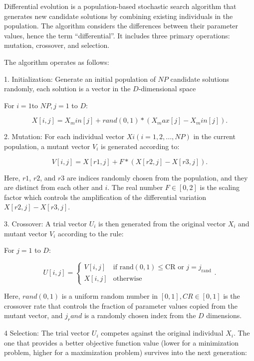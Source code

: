 \documentclass[a4paper,12pt]{article}
\begin{document}
Differential evolution is a population-based stochastic search algorithm that generates new candidate solutions by combining existing individuals in the population. The algorithm considers the differences between their parameter values, hence the term ``differential''. It includes three primary operations: mutation, crossover, and selection.

The algorithm operates as follows:

1. Initialization: Generate an initial population of $NP$ candidate solutions randomly, each solution is a vector in the $D$-dimensional space
    
    For $i = 1 $to $NP, j = 1$ to $D$:
    
    $$X[i, j] = X_min[j] + rand(0, 1) * (X_max[j] - X_min[j]) .$$
    
2. Mutation: For each individual vector $Xi (i=1, 2, ..., NP)$ in the current population, a mutant vector $V_i$ is generated according to:

    $$V[i, j] = X[r1, j] + F * (X[r2, j] - X[r3, j]) .$$

    Here, $r1$, $r2$, and $r3$ are indices randomly chosen from the population, and they are distinct from each other and $i$. The real number $F \in [0,2]$ is the scaling factor which controls the amplification of the differential variation $X[r2, j] - X[r3, j]$.

3. Crossover: A trial vector $U_i$ is then generated from the original vector $X_i$ and mutant vector $V_i$ according to the rule:

    For $j = 1$ to $D$:
    
    $$
        U[i, j] =
        \begin{cases}
            V[i, j] & \text{if } \text{rand}(0,1) \leq \text{CR} \text{ or } j = j_{\text{rand}} \\
            X[i, j] & \text{otherwise}
        \end{cases} .
    $$

Here, $rand(0,1)$ is a uniform random number in $[0,1], CR \in [0,1]$ is the crossover rate that controls the fraction of parameter values copied from the mutant vector, and $j_rand$ is a randomly chosen index from the $D$ dimensions.

4 Selection: The trial vector $U_i$ competes against the original individual $X_i$. The one that provides a better objective function value (lower for a minimization problem, higher for a maximization problem) survives into the next generation:
\end{document}
